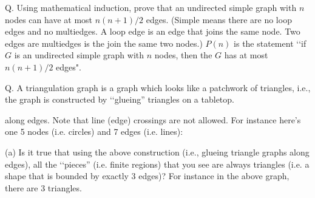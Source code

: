 \SOLUTION



\newpage
Q.
Using mathematical induction, prove that an undirected simple graph
with $n$ nodes can have at most $n(n + 1)/2$ edges.
(Simple means there are no loop edges and no multiedges.
A loop edge is an edge that joins the same node.
Two edges are multiedges is the join the same two nodes.)
$P(n)$ is the statement
\lq\lq if $G$ is an undirected simple graph with $n$ nodes, then the
$G$ has at most $n(n+1)/2$ edges".

\SOLUTION



\newpage
Q.
A triangulation graph is a graph which looks like a patchwork of 
 triangles, i.e., 
 the graph is constructed by \lq\lq glueing'' triangles
 on a tabletop. 
\begin{center}
\end{center}
along edges.
 Note that line (edge) crossings are not allowed.
 For instance here's one 5 nodes (i.e. circles) and 7 edges (i.e. lines):

\begin{center}
\end{center}

(a) Is it true that using the above construction (i.e., glueing
triangle graphs along edges), all the \lq\lq pieces'' (i.e. finite regions) 
that you see 
are always triangles (i.e. a shape that is bounded by 
exactly 3 edges)? For instance in the above graph, there are 3 triangles.

